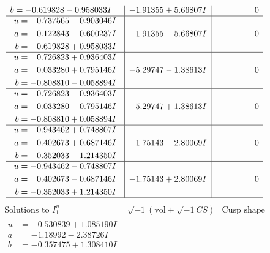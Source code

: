 \documentclass[1p]{elsarticle_modified}
\theoremstyle{definition}
\newcommand{\I}{\sqrt{-1}}
\begin{document}
$$\begin{array}{c|c|c}
\begin{aligned}
b &= -0.619828 - 0.958033 I\end{aligned}
 & -1.91355 + 5.66807 I & \phantom{-0.000000 } 0 \\ \hline\begin{aligned}
u &= -0.737565 - 0.903046 I \\
a &= \phantom{-}0.122843 - 0.600237 I \\
b &= -0.619828 + 0.958033 I\end{aligned}
 & -1.91355 - 5.66807 I & \phantom{-0.000000 } 0 \\ \hline\begin{aligned}
u &= \phantom{-}0.726823 + 0.936403 I \\
a &= \phantom{-}0.033280 + 0.795146 I \\
b &= -0.808810 - 0.058894 I\end{aligned}
 & -5.29747 - 1.38613 I & \phantom{-0.000000 } 0 \\ \hline\begin{aligned}
u &= \phantom{-}0.726823 - 0.936403 I \\
a &= \phantom{-}0.033280 - 0.795146 I \\
b &= -0.808810 + 0.058894 I\end{aligned}
 & -5.29747 + 1.38613 I & \phantom{-0.000000 } 0 \\ \hline\begin{aligned}
u &= -0.943462 + 0.748807 I \\
a &= \phantom{-}0.402673 + 0.687146 I \\
b &= -0.352033 - 1.214350 I\end{aligned}
 & -1.75143 - 2.80069 I & \phantom{-0.000000 } 0 \\ \hline\begin{aligned}
u &= -0.943462 - 0.748807 I \\
a &= \phantom{-}0.402673 - 0.687146 I \\
b &= -0.352033 + 1.214350 I\end{aligned}
 & -1.75143 + 2.80069 I & \phantom{-0.000000 } 0\\
 \hline 
 \end{array}$$\newpage$$\begin{array}{c|c|c}  
\text{Solutions to }I^u_{1}& \I (\text{vol} + \sqrt{-1}CS) & \text{Cusp shape}\\
 \hline 
\begin{aligned}
u &= -0.530839 + 1.085190 I \\
a &= -1.18992 - 2.38726 I \\
b &= -0.357475 + 1.308410 I\end{aligned}

\end{array}$$
\end{document}
